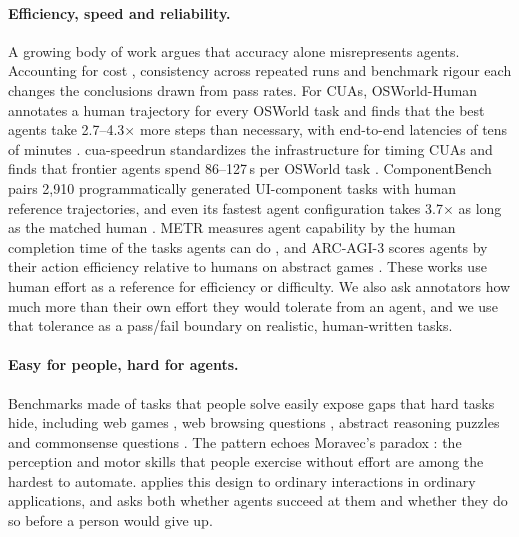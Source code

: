 \paragraph{Efficiency, speed and reliability.} A growing body of work argues that accuracy alone misrepresents agents. Accounting for cost \citep{kapoor2025agentsthatmatter,kapoor2026hal}, consistency across repeated runs \citep{yao2025taubench,rabanser2026reliability} and benchmark rigour \citep{zhu2025abc} each changes the conclusions drawn from pass rates. For CUAs, OSWorld-Human annotates a human trajectory for every OSWorld task and finds that the best agents take 2.7--4.3$\times$ more steps than necessary, with end-to-end latencies of tens of minutes \citep{abhyankar2026osworldhuman}. cua-speedrun standardizes the infrastructure for timing CUAs and finds that frontier agents spend 86--127\,s per OSWorld task \citep{aggarwal2026cuaspeedrun}. ComponentBench pairs 2,910 programmatically generated UI-component tasks with human reference trajectories, and even its fastest agent configuration takes 3.7$\times$ as long as the matched human \citep{guan2026componentbench}. METR measures agent capability by the human completion time of the tasks agents can do \citep{kwa2025metr}, and ARC-AGI-3 scores agents by their action efficiency relative to humans on abstract games \citep{arcprize2026arcagi3}. These works use human effort as a reference for efficiency or difficulty. We also ask annotators how much more than their own effort they would tolerate from an agent, and we use that tolerance as a pass/fail boundary on realistic, human-written tasks.

\paragraph{Easy for people, hard for agents.} Benchmarks made of tasks that people solve easily expose gaps that hard tasks hide, including web games \citep{thomas2025webgames}, web browsing questions \citep{song2025bearcubs}, abstract reasoning puzzles \citep{chollet2019measure,chollet2025arcagi2,arcprize2026arcagi3} and commonsense questions \citep{simplebench2024}. The pattern echoes Moravec's paradox \citep{moravec1988mind}: the perception and motor skills that people exercise without effort are among the hardest to automate. \bench applies this design to ordinary interactions in ordinary applications, and asks both whether agents succeed at them and whether they do so before a person would give up.

